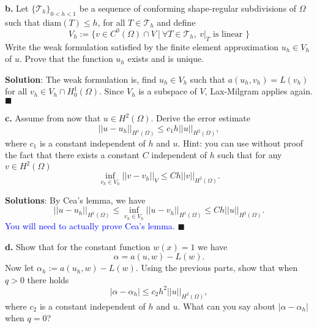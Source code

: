\documentclass[11pt]{article}
\begin{document}
\vskip 2cm



{\bf b.} Let $\{\mathcal{T}_h\}_{0<h<1}$ be a sequence of conforming shape-regular subdivisions of $\Omega$ such that $\text{diam}(T) \leq h$, for all $T \in \mathcal{T}_h$ and define 
\begin{equation}
    V_h := \{ v \in C^0(\Omega) \cap V \: | \: \forall T \in \mathcal{T}_h, \: v|_{T} \text{ is linear } \}
\end{equation}
Write the weak formulation satisfied by the finite element approximation $u_h \in V_h$ of $u$.
Prove that the function $u_h$ exists and is unique.

\vskip 1cm

{\bf Solution}: The weak formulation is, find $u_h \in V_h$ such that $a(u_h, v_h) = L(v_h)$ for all $v_h \in V_h\cap H^1_0(\Omega)$.
Since $V_h$ is a subspace of $V$, Lax-Milgram applies again.
$\blacksquare$


\vskip 2cm


{\bf c.}  Assume from now that $u \in H^2(\Omega)$. 
Derive the error estimate
\begin{equation}
    ||u - u_h||_{H^1(\Omega)} \leq c_1 h ||u||_{H^2(\Omega)},
\end{equation}
where $c_1$ is a constant independent of $h$ and $u$.
Hint: you can use without proof the fact that there exists a constant $C$ independent of $h$ such that for any $v \in H^2(\Omega)$
\begin{equation}
    \inf_{v_h\in V_h} ||v - v_h||_V \leq Ch ||v||_{H^2(\Omega)}.
\end{equation}

\vskip 1cm

{\bf Solutions}: By Cea's lemma, we have
\begin{equation}
    ||u - u_h||_{H^1(\Omega)} \leq \inf_{v_h \in V_h} || u - v_h||_{H^1(\Omega)} \leq Ch ||u||_{H^2(\Omega)}.
\end{equation}
\textcolor{blue}{You will need to actually prove Cea's lemma.}
$\blacksquare$


\vskip 2cm


\textbf{d.} Show that for the constant function $w(x) = 1$ we have
\begin{equation}
    \alpha = a(u,w) - L(w).
\end{equation}
Now let $\alpha_h := a(u_h, w) - L(w)$.
Using the previous parts, show that when $q > 0$ there holds
\begin{equation}
    |\alpha - \alpha_h| \leq c_2 h^2 ||u||_{H^2(\Omega)},
\end{equation}
where $c_2$ is a constant independent of $h$ and $u$. 
What can you say about $|\alpha - \alpha_h|$ when $q = 0$?
\end{document}
